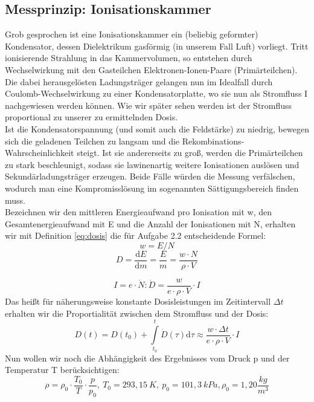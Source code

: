 \subsection{Messprinzip: Ionisationskammer}
Grob gesprochen ist eine Ionisationskammer ein (beliebig geformter) Kondensator, dessen Dielektrikum gasförmig (in unserem Fall Luft) vorliegt. Tritt ionisierende Strahlung in das Kammervolumen, so entstehen durch Wechselwirkung mit den Gasteilchen Elektronen-Ionen-Paare (Primärteilchen). Die dabei herausgelösten Ladungsträger gelangen nun im Idealfall durch Coulomb-Wechselwirkung zu einer Kondensatorplatte, wo sie nun als Stromfluss I nachgewiesen werden können. Wie wir später sehen werden ist der Stromfluss proportional zu unserer zu ermittelnden Dosis.\\ 
Ist die Kondensatorspannung (und somit auch die Feldstärke) zu niedrig, bewegen sich die geladenen Teilchen zu langsam und die Rekombinations-Wahrscheinlichkeit steigt. Ist sie andererseits zu groß, werden die Primärteilchen zu stark beschleunigt, sodass sie lawinenartig weitere Ionisationen auslösen und Sekundärladungsträger erzeugen. Beide Fälle würden die Messung verfälschen, wodurch man eine Kompromisslösung im sogenannten Sättigungsbereich finden muss.\\
Bezeichnen wir den mittleren Energieaufwand pro Ionisation mit w, den Gesamtenergieaufwand mit E und die Anzahl der Ionisationen mit N, erhalten wir mit Definition \eqref{eq:dosis} die für Aufgabe 2.2 entscheidende Formel:
\begin{equation}
	w = E / N
\end{equation}
\begin{equation}
	D = \frac{\textrm{d}E}{\textrm{d}m}=\frac{E}{m}=\frac{w \cdot N}{\rho \cdot V}
\end{equation}

\begin{equation}
	I = e \cdot \dot{N}: \dot{D} = \frac{w}{e \cdot \rho \cdot V} \cdot I
\end{equation}
Das heißt für näherungsweise konstante Dosisleistungen im Zeitintervall $\Delta t$ erhalten wir die Proportialität zwischen dem Stromfluss und der Dosis:
\begin{equation}
	D(t) = D(t_0) + \int \limits_{t_0}^{t} \dot{D}(\tau) \mathrm{d}\tau \approx \frac{w \cdot \Delta t}{e \cdot \rho \cdot V} \cdot I
\end{equation}
Nun wollen wir noch die Abhängigkeit des Ergebnisses vom Druck p und der Temperatur T berücksichtigen:
\begin{equation}
	\rho = \rho_0 \cdot \frac{T_0}{T} \cdot \frac{p}{p_0} ,
	\ T_0 = 293,15\ K,\ p_0 = 101,3\ kPa, \rho_0 =1,20 \frac{kg}{m^3}
\end{equation}

